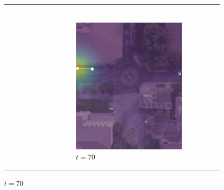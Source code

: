\documentclass[conference]{IEEEtran}
\begin{document}
\begin{figure}
\begin{tabular}{M{.1\linewidth}  M{.3\linewidth} M{.3\linewidth}  M{.3\linewidth}}
\begin{subfigure}[b]{\linewidth}
	\end{subfigure} \\
	
	 & 
	\begin{subfigure}[b]{\linewidth}
		\includegraphics[width=\linewidth]{./figures/comparison/rand_death_1_2_t=70.png}
		\caption{$t=70$}
	\end{subfigure}&

\end{tabular}
\end{figure}
\end{document}
